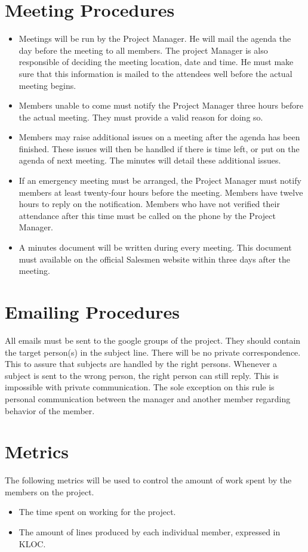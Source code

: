 \documentclass[salesmen, twoside]{../../../templates/latex/2009/softproj}
\begin{document}
\begin{projdoc}
\section{Meeting Procedures}
\begin{itemize}
\item
Meetings will be run by the Project Manager. He will mail the agenda the day before the meeting to all members. The project Manager is also responsible of deciding the meeting location, date and time. He must make sure that this information is mailed to the attendees well before the actual meeting begins.
\item
Members unable to come must notify the Project Manager three hours before the actual meeting. They must provide a valid reason for doing so.
\item
Members may raise additional issues on a meeting after the agenda has been finished. These issues will then be handled if there is time left, or put on the agenda of next meeting. The minutes will detail these additional issues.
\item
If an emergency meeting must be arranged, the Project Manager must notify members at least twenty-four hours before the meeting. Members have twelve hours to reply on the notification. Members who have not verified their attendance after this time must be called on the phone by the Project Manager.
\item
A minutes document will be written during every meeting. This document must available on the official Salesmen website within three days after the meeting.
\end{itemize}

\section{Emailing Procedures}
All emails must be sent to the google groups \cite{googlegroup} of the project. They should contain the target person(s) in the subject line. There will be no private correspondence. This to assure that subjects are handled by the right persons. Whenever a subject is sent to the wrong person, the right person can still reply. This is impossible with private communication. The sole exception on this rule is personal communication between the manager and another member regarding behavior of the member.

\section{Metrics}
The following metrics will be used to control the amount of work spent by the members on the project.
\begin{itemize}
\item The time spent on working for the project.
\item The amount of lines produced by each individual member, expressed in KLOC.
\end{itemize}


\end{projdoc}
\end{document}
